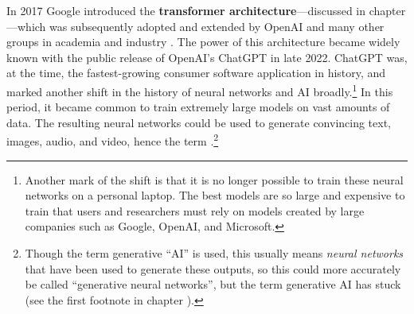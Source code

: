 In 2017 Google introduced the \textbf{transformer architecture}---discussed in chapter ---which was subsequently adopted and extended by OpenAI and many other groups in academia and industry \cite{vaswani2017attention}. The power of this architecture became widely known with the public release of OpenAI's ChatGPT in late 2022. ChatGPT was, at the time, the fastest-growing consumer software application in history, and marked another shift in the history of neural networks and AI broadly.\footnote{Another mark of the shift is that it is no longer possible to train these neural networks on a personal laptop. The best models are so large and expensive to train that users and researchers must rely on models created by large companies such as Google, OpenAI, and Microsoft.} In this period, it became common to train extremely large models on vast amounts of data. The resulting neural networks could be used to generate convincing text, images, audio, and video, hence the term .\footnote{Though the term generative ``AI'' is used, this usually means \emph{neural networks} that have been used to generate these outputs, so this could more accurately be called ``generative neural networks'', but the term generative AI has stuck (see the first footnote in chapter ).} 

